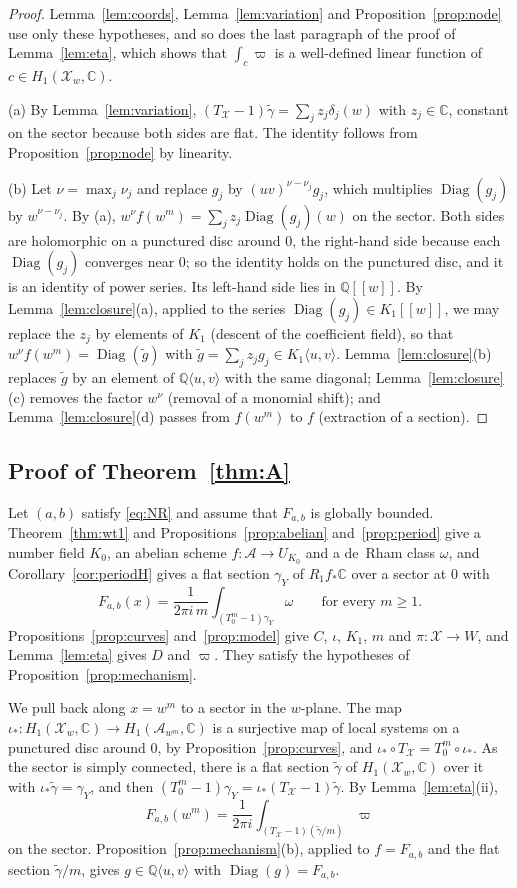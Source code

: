 \documentclass[11pt]{amsart}
\theoremstyle{definition}
\theoremstyle{remark}
\numberwithin{equation}{section}
\newcommand{\Q}{\mathbb{Q}}
\newcommand{\C}{\mathbb{C}}
\newcommand{\cX}{\mathcal{X}}
\newcommand{\cA}{\mathcal{A}}
\newcommand{\alg}[2]{#1\langle #2\rangle}
\DeclareMathOperator{\Diag}{Diag}
\newcommand{\Fab}{F_{a,b}}
\begin{document}
\begin{proof}
Lemma~\ref{lem:coords}, Lemma~\ref{lem:variation} and Proposition~\ref{prop:node} use only these hypotheses, and so does the last paragraph of the proof of Lemma~\ref{lem:eta}, which shows that $\int_c\varpi$ is a well-defined linear function of $c\in H_1(\cX_w,\C)$.

(a) By Lemma~\ref{lem:variation}, $(T_\cX-1)\tilde\gamma=\sum_jz_j\delta_j(w)$ with $z_j\in\C$, constant on the sector because both sides are flat. The identity follows from Proposition~\ref{prop:node} by linearity.

(b) Let $\nu=\max_j\nu_j$ and replace $g_j$ by $(uv)^{\nu-\nu_j}g_j$, which multiplies $\Diag(g_j)$ by $w^{\nu-\nu_j}$. By (a), $w^\nu f(w^m)=\sum_jz_j\Diag(g_j)(w)$ on the sector. Both sides are holomorphic on a punctured disc around $0$, the right-hand side because each $\Diag(g_j)$ converges near $0$; so the identity holds on the punctured disc, and it is an identity of power series. Its left-hand side lies in $\Q[[w]]$. By Lemma~\ref{lem:closure}(a), applied to the series $\Diag(g_j)\in K_1[[w]]$, we may replace the $z_j$ by elements of $K_1$ (descent of the coefficient field), so that $w^\nu f(w^m)=\Diag(\tilde g)$ with $\tilde g=\sum_jz_jg_j\in\alg{K_1}{u,v}$. Lemma~\ref{lem:closure}(b) replaces $\tilde g$ by an element of $\alg\Q{u,v}$ with the same diagonal; Lemma~\ref{lem:closure}(c) removes the factor $w^\nu$ (removal of a monomial shift); and Lemma~\ref{lem:closure}(d) passes from $f(w^m)$ to $f$ (extraction of a section).
\end{proof}

\subsection{Proof of Theorem~\ref{thm:A}}\label{subsec:proofA}
Let $(a,b)$ satisfy \eqref{eq:NR} and assume that $\Fab$ is globally bounded. Theorem~\ref{thm:wt1} and Propositions~\ref{prop:abelian} and~\ref{prop:period} give a number field $K_0$, an abelian scheme $f:\cA\to U_{K_0}$ and a de~Rham class $\omega$, and Corollary~\ref{cor:periodH} gives a flat section $\gamma_Y$ of $R_1f_*\C$ over a sector at $0$ with
\[
\Fab(x)=\frac1{2\pi i\,m}\int_{(T_0^m-1)\gamma_Y}\omega\qquad\text{for every }m\ge1 .
\]
Propositions~\ref{prop:curves} and~\ref{prop:model} give $C$, $\iota$, $K_1$, $m$ and $\pi:\cX\to W$, and Lemma~\ref{lem:eta} gives $D$ and $\varpi$. They satisfy the hypotheses of Proposition~\ref{prop:mechanism}.

We pull back along $x=w^m$ to a sector in the $w$-plane. The map $\iota_*:H_1(\cX_w,\C)\to H_1(\cA_{w^m},\C)$ is a surjective map of local systems on a punctured disc around $0$, by Proposition~\ref{prop:curves}, and $\iota_*\circ T_\cX=T_0^m\circ\iota_*$. As the sector is simply connected, there is a flat section $\tilde\gamma$ of $H_1(\cX_w,\C)$ over it with $\iota_*\tilde\gamma=\gamma_Y$, and then $(T_0^m-1)\gamma_Y=\iota_*(T_\cX-1)\tilde\gamma$. By Lemma~\ref{lem:eta}(ii),
\[
\Fab(w^m)=\frac1{2\pi i}\int_{(T_\cX-1)(\tilde\gamma/m)}\varpi
\]
on the sector. Proposition~\ref{prop:mechanism}(b), applied to $f=\Fab$ and the flat section $\tilde\gamma/m$, gives $g\in\alg\Q{u,v}$ with $\Diag(g)=\Fab$.
\end{document}
